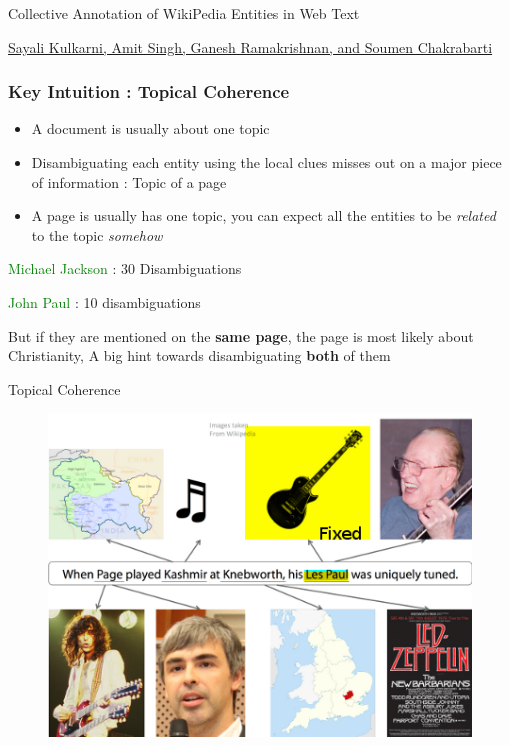 


\begin{frame}
\begin{center}
 
  Collective Annotation of WikiPedia Entities in Web Text 
  
  \bigskip
  
 \hyperref[thepaper]{ Sayali Kulkarni, Amit Singh, Ganesh Ramakrishnan, and Soumen Chakrabarti}
  \end{center}

\end{frame}

\begin{frame}
 \frametitle{Key Intuition : Topical Coherence}
 \begin{itemize}
  \item A document is usually about one topic \bigskip
  \item Disambiguating each entity using the local clues misses out on a major piece of information : Topic of a page \bigskip
  \item A page is usually has one topic, you can expect all the entities to be \emph{related} to the topic \emph{somehow} \bigskip
  \end{itemize}
  \textcolor{green}{Michael Jackson} : 30 Disambiguations 
  
 \textcolor{green}{John Paul} : 10 disambiguations 
 
 
 
  But if they are mentioned on the \textbf{same page}, the page is most likely about Christianity, A big hint towards disambiguating \textbf{both} of them
  
 
  \end{frame}
\begin{frame}{Topical Coherence}
  \begin{figure}[h]
 \centering
 \includegraphics[bb=0 0 216 165]{./nedcollective.png}
\end{figure}

 \end{frame}

